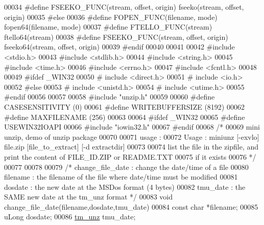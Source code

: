 \begin{DoxyCode}
00034 \textcolor{preprocessor}{#define FSEEKO\_FUNC(stream, offset, origin) fseeko(stream, offset, origin)}
00035 \textcolor{preprocessor}{#else}
00036 \textcolor{preprocessor}{#define FOPEN\_FUNC(filename, mode) fopen64(filename, mode)}
00037 \textcolor{preprocessor}{#define FTELLO\_FUNC(stream) ftello64(stream)}
00038 \textcolor{preprocessor}{#define FSEEKO\_FUNC(stream, offset, origin) fseeko64(stream, offset, origin)}
00039 \textcolor{preprocessor}{#endif}
00040 
00041 
00042 \textcolor{preprocessor}{#include <stdio.h>}
00043 \textcolor{preprocessor}{#include <stdlib.h>}
00044 \textcolor{preprocessor}{#include <string.h>}
00045 \textcolor{preprocessor}{#include <time.h>}
00046 \textcolor{preprocessor}{#include <errno.h>}
00047 \textcolor{preprocessor}{#include <fcntl.h>}
00048 
00049 \textcolor{preprocessor}{#ifdef \_WIN32}
00050 \textcolor{preprocessor}{# include <direct.h>}
00051 \textcolor{preprocessor}{# include <io.h>}
00052 \textcolor{preprocessor}{#else}
00053 \textcolor{preprocessor}{# include <unistd.h>}
00054 \textcolor{preprocessor}{# include <utime.h>}
00055 \textcolor{preprocessor}{#endif}
00056 
00057 
00058 \textcolor{preprocessor}{#include "unzip.h"}
00059 
00060 \textcolor{preprocessor}{#define CASESENSITIVITY (0)}
00061 \textcolor{preprocessor}{#define WRITEBUFFERSIZE (8192)}
00062 \textcolor{preprocessor}{#define MAXFILENAME (256)}
00063 
00064 \textcolor{preprocessor}{#ifdef \_WIN32}
00065 \textcolor{preprocessor}{#define USEWIN32IOAPI}
00066 \textcolor{preprocessor}{#include "iowin32.h"}
00067 \textcolor{preprocessor}{#endif}
00068 \textcolor{comment}{/*}
00069 \textcolor{comment}{  mini unzip, demo of unzip package}
00070 \textcolor{comment}{}
00071 \textcolor{comment}{  usage :}
00072 \textcolor{comment}{  Usage : miniunz [-exvlo] file.zip [file\_to\_extract] [-d extractdir]}
00073 \textcolor{comment}{}
00074 \textcolor{comment}{  list the file in the zipfile, and print the content of FILE\_ID.ZIP or README.TXT}
00075 \textcolor{comment}{    if it exists}
00076 \textcolor{comment}{*/}
00077 
00078 
00079 \textcolor{comment}{/* change\_file\_date : change the date/time of a file}
00080 \textcolor{comment}{    filename : the filename of the file where date/time must be modified}
00081 \textcolor{comment}{    dosdate : the new date at the MSDos format (4 bytes)}
00082 \textcolor{comment}{    tmu\_date : the SAME new date at the tm\_unz format */}
00083 \textcolor{keywordtype}{void} change\_file\_date(filename,dosdate,tmu\_date)
00084     \textcolor{keyword}{const} \textcolor{keywordtype}{char} *filename;
00085     uLong dosdate;
00086     \hyperlink{structtm__unz__s}{tm\_unz} tmu\_date;

\end{DoxyCode}
